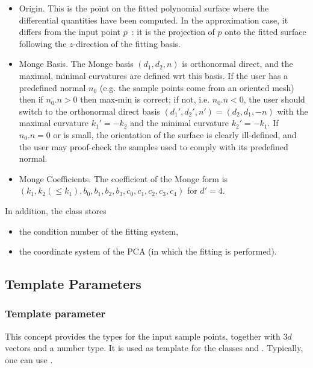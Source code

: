 \begin{itemize}
\item Origin. This is the point on the fitted polynomial surface
where the differential quantities have been computed. In the
approximation case, it differs from the input point $p$~: it is the
projection of $p$ onto the fitted surface following the $z$-direction
of the fitting basis.

\item Monge Basis. The Monge basis $(d_1,d_2,n)$ is orthonormal
direct, and the maximal, minimal curvatures are defined wrt this
basis. If the user has a predefined normal $n_0$ (e.g. the sample
points come from an oriented mesh) then if $n_0 . n >0$ then max-min
is correct; if not, i.e. $n_0 . n <0$, the user should switch to the
orthonormal direct basis $(d_1',d_2',n')=(d_2,d_1,-n)$ with the
maximal curvature $k_1'=-k_2$ and the minimal curvature
$k_2'=-k_1$. If $n_0 . n =0$ or is small, the orientation of the
surface is clearly ill-defined, and the user may proof-check the
samples used to comply with its predefined normal.


\item Monge Coefficients.
The coefficient of the Monge form is $(k_1, k_2 (\leq k_1),
b_0, b_1, b_2, b_3, c_0, c_1, c_2, c_3, c_4)$ for $d' = 4$.

\end{itemize}

In addition, the class  stores 
\begin{itemize}
\item
the condition number of the fitting system,
\item 
the coordinate system of the PCA (in which the fitting is performed).
\end{itemize}

\subsection{Template Parameters}

\subsubsection{Template parameter }

This concept provides the types for the input sample points, together
with $3d$ vectors and a number type. It is used as template for the
classes
 and 
. Typically, one can use .

